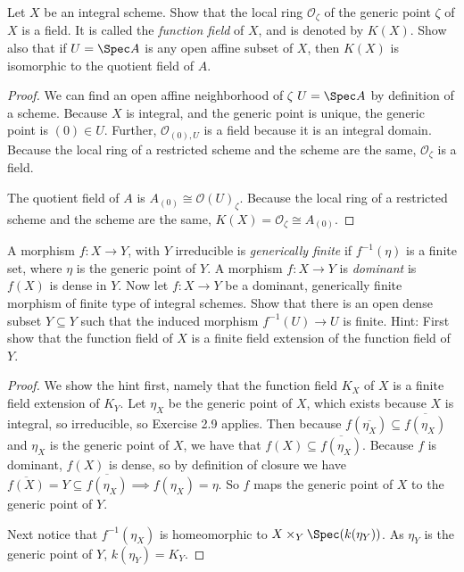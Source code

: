 \begin{exercise}%
	Let $X $ be an integral scheme. Show that the local ring $\mathscr{O}_{\zeta} $ of the generic point $\zeta  $ of $X $ is a field. It is called the \textit{function field} of $X $, and is denoted by $K(X) $. Show also that if $U = \Spec A $ is any open affine subset of $X $, then $K(X) $ is isomorphic to the quotient field of $A $.
\end{exercise}
\begin{proof}
	We can find an open affine neighborhood of $\zeta  $ $U = \Spec A $ by definition of a scheme.
	Because $X $ is integral, and the generic point is unique, the generic point is $(0) \in U $.
	Further, $\mathscr{O}_{(0),U} $ is a field because it is an integral domain.
	Because the local ring of a restricted scheme and the scheme are the same, $\mathscr{O}_{\zeta } $ is a field.

	The quotient field of $A $ is $A_{(0)} \cong \mathscr{O}(U)_{\zeta} $.
	Because the local ring of a restricted scheme and the scheme are the same, $K(X) = \mathscr{O}_{\zeta }\cong A_{(0)} $.
\end{proof}

\begin{exercise}%
	A morphism $f: X\to Y $, with $Y $ irreducible is \textit{generically finite} if $f^{-1}(\eta ) $ is a finite set, where $\eta  $ is the generic point of $Y $. A morphism $f: X\to Y $ is \textit{dominant} is $f(X) $ is dense in $Y $. Now let $f: X\to Y $ be a dominant, generically finite morphism of finite type of integral schemes. Show that there is an open dense subset $Y \subseteq Y $ such that the induced morphism $f^{-1}(U) \to U $ is finite.
	\ifhint
		Hint: First show that the function field of $X $ is a finite field extension of the function field of $Y $.
	\fi
\end{exercise}
\begin{proof}
	We show the hint first, namely that the function field $K_X $ of $X $ is a finite field extension of $K_Y $.
	Let $\eta _X $ be the generic point of $X $, which exists because $X $ is integral, so irreducible, so Exercise 2.9 applies.
	Then because $f(\overline{\eta _X}) \subseteq \overline{f(\eta _X)}   $ and $\eta _X $ is the generic point of $X $, we have that $f(X) \subseteq \overline{f(\eta_X)}  $.
	Because $f  $ is dominant, $f(X) $ is dense, so by definition of closure we have $\overline{f(X)} = Y \subseteq \overline{f(\eta _X)} \implies f(\eta_X) = \eta$.
	So $f $ maps the generic point of $X $ to the generic point of $Y $.

	Next notice that $f^{-1}(\eta_X ) $ is homeomorphic to $X \times_Y \Spec(k(\eta_Y)) $.
	As $\eta_Y  $ is the generic point of $Y $, $k(\eta _Y) = K_Y $.
\end{proof}

